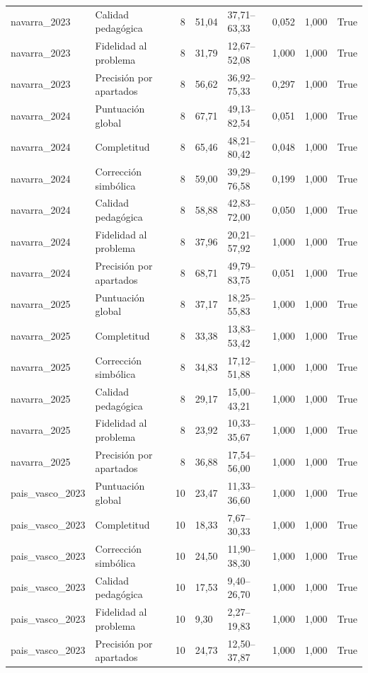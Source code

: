 \begin{tabular}{llrllllr}
navarra\_2023 & Calidad pedagógica & 8 & 51,04 & 37,71–63,33 & 0,052 & 1,000 & True \\
navarra\_2023 & Fidelidad al problema & 8 & 31,79 & 12,67–52,08 & 1,000 & 1,000 & True \\
navarra\_2023 & Precisión por apartados & 8 & 56,62 & 36,92–75,33 & 0,297 & 1,000 & True \\
navarra\_2024 & Puntuación global & 8 & 67,71 & 49,13–82,54 & 0,051 & 1,000 & True \\
navarra\_2024 & Completitud & 8 & 65,46 & 48,21–80,42 & 0,048 & 1,000 & True \\
navarra\_2024 & Corrección simbólica & 8 & 59,00 & 39,29–76,58 & 0,199 & 1,000 & True \\
navarra\_2024 & Calidad pedagógica & 8 & 58,88 & 42,83–72,00 & 0,050 & 1,000 & True \\
navarra\_2024 & Fidelidad al problema & 8 & 37,96 & 20,21–57,92 & 1,000 & 1,000 & True \\
navarra\_2024 & Precisión por apartados & 8 & 68,71 & 49,79–83,75 & 0,051 & 1,000 & True \\
navarra\_2025 & Puntuación global & 8 & 37,17 & 18,25–55,83 & 1,000 & 1,000 & True \\
navarra\_2025 & Completitud & 8 & 33,38 & 13,83–53,42 & 1,000 & 1,000 & True \\
navarra\_2025 & Corrección simbólica & 8 & 34,83 & 17,12–51,88 & 1,000 & 1,000 & True \\
navarra\_2025 & Calidad pedagógica & 8 & 29,17 & 15,00–43,21 & 1,000 & 1,000 & True \\
navarra\_2025 & Fidelidad al problema & 8 & 23,92 & 10,33–35,67 & 1,000 & 1,000 & True \\
navarra\_2025 & Precisión por apartados & 8 & 36,88 & 17,54–56,00 & 1,000 & 1,000 & True \\
pais\_vasco\_2023 & Puntuación global & 10 & 23,47 & 11,33–36,60 & 1,000 & 1,000 & True \\
pais\_vasco\_2023 & Completitud & 10 & 18,33 & 7,67–30,33 & 1,000 & 1,000 & True \\
pais\_vasco\_2023 & Corrección simbólica & 10 & 24,50 & 11,90–38,30 & 1,000 & 1,000 & True \\
pais\_vasco\_2023 & Calidad pedagógica & 10 & 17,53 & 9,40–26,70 & 1,000 & 1,000 & True \\
pais\_vasco\_2023 & Fidelidad al problema & 10 & 9,30 & 2,27–19,83 & 1,000 & 1,000 & True \\
pais\_vasco\_2023 & Precisión por apartados & 10 & 24,73 & 12,50–37,87 & 1,000 & 1,000 & True \\

\end{tabular}
